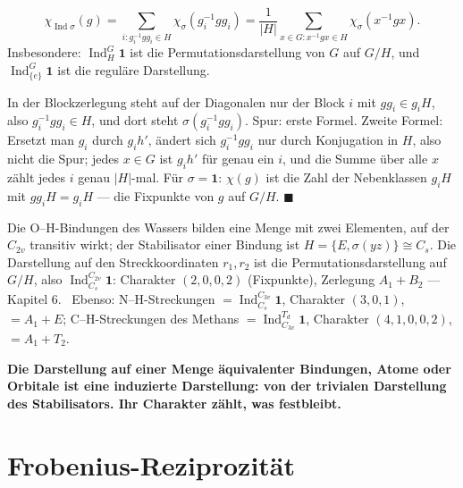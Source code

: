 \begin{merksatz}
\[ \chi_{\operatorname{Ind}\sigma}(g) = \sum_{i\colon g_i^{-1}gg_i\in H}\chi_\sigma(g_i^{-1}gg_i) = \frac1{|H|}\sum_{x\in G\colon x^{-1}gx\in H}\chi_\sigma(x^{-1}gx) . \]
Insbesondere: $\operatorname{Ind}^G_H\mathbf 1$ ist die Permutationsdarstellung von $G$ auf $G/H$, und $\operatorname{Ind}^G_{\{e\}}\mathbf 1$ ist die reguläre Darstellung.

In der Blockzerlegung steht auf der Diagonalen nur der Block $i$ mit $gg_i\in g_iH$, also $g_i^{-1}gg_i\in H$, und dort steht $\sigma(g_i^{-1}gg_i)$. Spur: erste Formel. Zweite Formel: Ersetzt man $g_i$ durch $g_ih'$, ändert sich $g_i^{-1}gg_i$ nur durch Konjugation in $H$, also nicht die Spur; jedes $x\in G$ ist $g_ih'$ für genau ein $i$, und die Summe über alle $x$ zählt jedes $i$ genau $|H|$-mal. Für $\sigma = \mathbf 1$: $\chi(g)$ ist die Zahl der Nebenklassen $g_iH$ mit $gg_iH = g_iH$ --- die Fixpunkte von $g$ auf $G/H$. $\blacksquare$

Die O--H-Bindungen des Wassers bilden eine Menge mit zwei Elementen, auf der $C_{2v}$ transitiv wirkt; der Stabilisator einer Bindung ist $H = \{E, \sigma(yz)\}\cong C_s$. Die Darstellung auf den Streckkoordinaten $r_1, r_2$ ist die Permutationsdarstellung auf $G/H$, also $\operatorname{Ind}^{C_{2v}}_{C_s}\mathbf 1$: Charakter $(2, 0, 0, 2)$ (Fixpunkte), Zerlegung $A_1 + B_2$ --- Kapitel 6. \checkmark\ Ebenso: N--H-Streckungen $= \operatorname{Ind}^{C_{3v}}_{C_s}\mathbf 1$, Charakter $(3, 0, 1)$, $= A_1 + E$; C--H-Streckungen des Methans $= \operatorname{Ind}^{T_d}_{C_{3v}}\mathbf 1$, Charakter $(4, 1, 0, 0, 2)$, $= A_1 + T_2$.

\begin{center}
\begin{minipage}{0.9\textwidth}
\textbf{Die Darstellung auf einer Menge äquivalenter Bindungen, Atome oder Orbitale ist eine induzierte Darstellung: von der trivialen Darstellung des Stabilisators. Ihr Charakter zählt, was festbleibt.}
\end{minipage}
\end{center}
\end{merksatz}

\section{Frobenius-Reziprozität}

